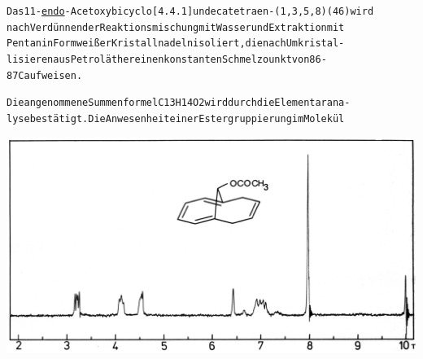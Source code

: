\documentclass[a4paper,11pt]{article}
\begin{document}
\schemestop
\chemnameinit{}
\begin{alltt}

Das 11-\underline{endo}-Acetoxybicyclo[4.4.1]undecatetraen-(1‚3,5,8) (46) wird
nach Verdünnen der Reaktionsmischung mit Wasser und Extraktion mit
Pentan in Form weißer Kristallnadeln isoliert, die nach Umkristal-
lisieren aus Petroläther einen konstanten Schmelzounkt von 86 -
87\degree{}C aufweisen.

Die angenommene Summenformel C13H14O2 wird durch die Elementarana-
lyse bestätigt. Die Anwesenheit einer Estergruppierung im Molekül

\end{alltt}
\hspace*{-0.25cm}\includegraphics[width=14.29cm]{NMR_017}
\end{document}
